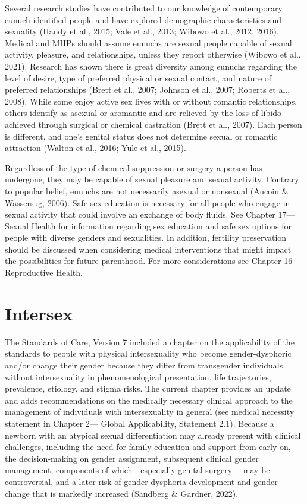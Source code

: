 \documentclass[
]{book}
\begin{document}
Several research studies have contributed to
our knowledge of contemporary eunuch-identified
people and have explored demographic characteristics and sexuality (Handy et al., 2015; Vale
et al., 2013; Wibowo et al., 2012, 2016). Medical
and MHPs should assume eunuchs are sexual
people capable of sexual activity, pleasure, and
relationships, unless they report otherwise
(Wibowo et al., 2021). Research has shown there
is great diversity among eunuchs regarding the
level of desire, type of preferred physical or sexual contact, and nature of preferred relationships
(Brett et al., 2007; Johnson et al., 2007; Roberts
et al., 2008). While some enjoy active sex lives
with or without romantic relationships, others
identify as asexual or aromantic and are relieved
by the loss of libido achieved through surgical
or chemical castration (Brett et al., 2007). Each
person is different, and one's genital status does
not determine sexual or romantic attraction
(Walton et al., 2016; Yule et al., 2015).

Regardless of the type of chemical suppression
or surgery a person has undergone, they may be
capable of sexual pleasure and sexual activity.
Contrary to popular belief, eunuchs are not necessarily asexual or nonsexual (Aucoin \& Wassersug,
2006). Safe sex education is necessary for all people
who engage in sexual activity that could involve an
exchange of body fluids. See Chapter 17---Sexual
Health for information regarding sex education and
safe sex options for people with diverse genders and
sexualities. In addition, fertility preservation should
be discussed when considering medical interventions
that might impact the possibilities for future parenthood. For more considerations see Chapter 16---
Reproductive Health.

\hypertarget{intersex}{%
\chapter{Intersex}\label{intersex}}

The Standards of Care, Version 7 included a chapter on the applicability of the standards to people
with physical intersexuality who become
gender-dysphoric and/or change their gender
because they differ from transgender individuals
without intersexuality in phenomenological presentation, life trajectories, prevalence, etiology, and
stigma risks. The current chapter provides an
update and adds recommendations on the medically necessary clinical approach to the management of individuals with intersexuality in general
(see medical necessity statement in Chapter 2---
Global Applicability, Statement 2.1). Because a newborn with an atypical sexual differentiation may
already present with clinical challenges, including
the need for family education and support from
early on, the decision-making on gender assignment, subsequent clinical gender management,
components of which---especially genital surgery---
may be controversial, and a later risk of gender
dysphoria development and gender change that is
markedly increased (Sandberg \& Gardner, 2022).
\end{document}
